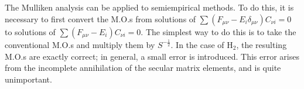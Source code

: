 The Mulliken analysis can be applied to semiempirical methods.  To do this, it
is necessary to first convert the M.O.s from solutions of  $\sum(F_{\mu
\nu}-E_i\delta_{\mu\nu}) C_{\nu i} =0$ to solutions of $\sum(F_{\mu \nu}-E_i)
C_{\nu i} =0$.  The simplest way to do this is to take the conventional M.O.s
and multiply them by $S^{-\frac{1}{2}}$.  In the case of H$_2$, the resulting
M.O.s are exactly correct; in general, a small error is introduced.  This error
arises from the incomplete annihilation of the secular matrix elements, and is
quite unimportant.

